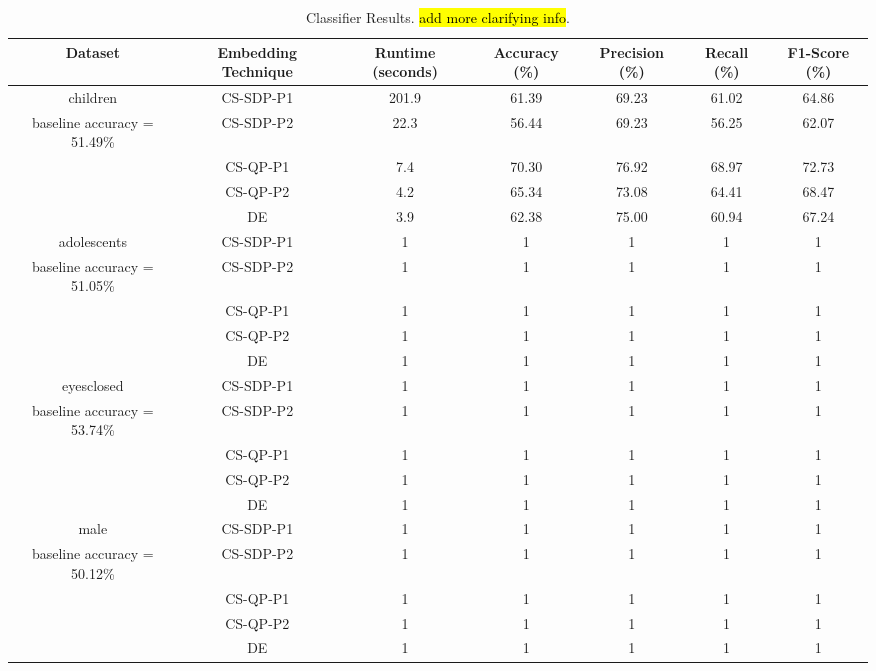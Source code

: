 \documentclass[sigconf]{acmart}
\begin{document}
\begin{table}[t]
    \centering
    \caption{Classifier Results. \hl{add more clarifying info}.}
    \begin{tabular}{c c c c c c c}
        \hline
        Dataset & Embedding Technique & Runtime (seconds) & Accuracy (\%) & Precision (\%) & Recall (\%) & F1-Score (\%)\\
        \hline
        children & CS-SDP-P1 & 201.9 & 61.39 & 69.23 & 61.02 & 64.86 \\
        baseline accuracy = 51.49\% & CS-SDP-P2 & 22.3 & 56.44 & 69.23 & 56.25 & 62.07 \\
        & CS-QP-P1 & 7.4 & 70.30 & 76.92 & 68.97 & 72.73 \\
        & CS-QP-P2 & 4.2 & 65.34 & 73.08 & 64.41 & 68.47 \\
        & DE & 3.9 & 62.38 & 75.00 & 60.94 & 67.24 \\
        \hline
        adolescents & CS-SDP-P1 & 1 & 1 & 1 & 1 & 1 \\
        baseline accuracy = 51.05\% & CS-SDP-P2 & 1 & 1 & 1 & 1 & 1 \\
        & CS-QP-P1 & 1 & 1 & 1 & 1 & 1 \\
        & CS-QP-P2 & 1 & 1 & 1 & 1 & 1 \\
        & DE & 1 & 1 & 1 & 1 & 1 \\
        \hline
        eyesclosed & CS-SDP-P1 & 1 & 1 & 1 & 1 & 1 \\
        baseline accuracy = 53.74\% & CS-SDP-P2 & 1 & 1 & 1 & 1 & 1 \\
        & CS-QP-P1 & 1 & 1 & 1 & 1 & 1 \\
        & CS-QP-P2 & 1 & 1 & 1 & 1 & 1 \\
        & DE & 1 & 1 & 1 & 1 & 1 \\
        \hline
        male & CS-SDP-P1 & 1 & 1 & 1 & 1 & 1 \\
        baseline accuracy = 50.12\% & CS-SDP-P2 & 1 & 1 & 1 & 1 & 1 \\
        & CS-QP-P1 & 1 & 1 & 1 & 1 & 1 \\
        & CS-QP-P2 & 1 & 1 & 1 & 1 & 1 \\
        & DE & 1 & 1 & 1 & 1 & 1 \\
        \hline
    \end{tabular}
    \label{tab:results}
\end{table}
\end{document}
